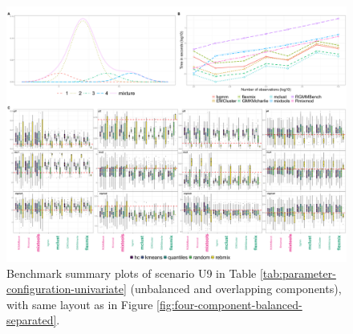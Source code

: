 \begin{figure}

{\centering \includegraphics[width=1\linewidth]{./figs/univariate/univariate_unbalanced_overlapping} 

}

\caption{Benchmark summary plots of scenario U9 in Table \ref{tab:parameter-configuration-univariate} (unbalanced and overlapping components), with same layout as in Figure \ref{fig:four-component-balanced-separated}.}\label{fig:four-component-unbalanced-overlapping}
\end{figure}


